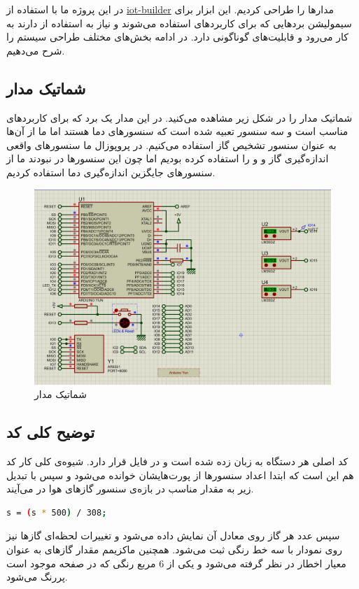 در این پروژه ما با استفاده از 
\href{https://labcenter.s3.amazonaws.com/downloads/iotHelp.pdf}{iot-builder}
مدار‌ها را طراحی کردیم. این ابزار برای سیمولیشن برد‌هایی که برای کاربرد‌های 
استفاده می‌شوند و نیاز به استفاده از 
 دارند به کار می‌رود و قابلیت‌های گوناگونی دارد.  در ادامه بخش‌های مختلف طراحی سیستم را شرح می‌دهیم. 
\subsection{شماتیک مدار}
شماتیک مدار را در شکل زیر مشاهده می‌کنید. در این مدار یک برد 
که برای کاربرد‌های 
مناسب است و سه سنسور
تعبیه شده است که سنسور‌های دما هستند اما ما از آن‌ها به عنوان سنسور تشخیص گاز استفاده می‌کنیم. در پروپوزال ما سنسور‌های واقعی اندازه‌گیری گاز 
و 
و
را استفاده کرده بودیم اما چون این سنسور‌ها در 
نبودند ما از سنسور‌های جایگزین اندازه‌گیری دما استفاده کردیم.
\begin{figure}[h!]
	\centering		
	\includegraphics[width=\linewidth]{figs/circuit.png}
	\caption{شماتیک مدار}
\end{figure}

\subsection{توضیح کلی کد}
کد اصلی هر دستگاه به زبان 
زده شده است و در فایل 
قرار دارد. شیوه‌ی کلی کار کد هم این است که ابتدا اعداد سنسور‌ها از پورت‌هایشان خوانده می‌شود و سپس با تبدیل زیر به مقدار مناسب در بازه‌ی سنسور گاز‌های هوا در می‌آیند. 
\begin{latin}
	\begin{lstlisting}[language=bash]
s = (s * 500) / 308;
	\end{lstlisting}
\end{latin}
سپس عدد هر گاز روی 
معادل آن نمایش داده می‌شود و تغییرات لحظه‌ای گاز‌ها نیز روی نمودار با سه خط رنگی ثبت می‌شود. همچنین ماکزیمم مقدار گاز‌های به عنوان معیار اخطار در نظر گرفته می‌شود و یکی از 6 مربع رنگی که در صفحه موجود است پررنگ می‌شود. 

